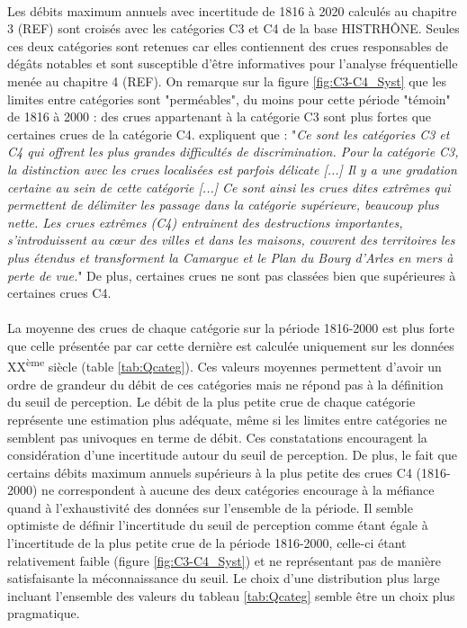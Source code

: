 \documentclass[11pt]{article}
\begin{document}
	\paragraph{} Les débits maximum annuels avec incertitude de 1816 à 2020 calculés au chapitre 3 (REF) sont croisés avec les catégories C3 et C4 de la base HISTRHÔNE. Seules ces deux catégories sont retenues car elles contiennent des crues responsables de dégâts notables et sont susceptible d'être informatives pour l'analyse fréquentielle menée au chapitre 4 (REF). On remarque sur la figure \ref{fig:C3-C4_Syst} que les limites entre catégories sont "perméables", du moins pour cette période "témoin" de 1816 à 2000 : des crues appartenant à la catégorie C3 sont plus fortes que certaines crues de la catégorie C4. \citet{pichard_sept_2014} expliquent que : "\textit{Ce sont les catégories C3 et C4 qui offrent les plus grandes difficultés de discrimination. Pour la catégorie C3, la distinction avec les crues localisées est parfois délicate [...] Il y a une gradation certaine au sein de cette catégorie [...] Ce sont ainsi les crues dites extrêmes qui permettent de délimiter les passage dans la catégorie supérieure, beaucoup plus nette. Les crues extrêmes (C4) entrainent des destructions importantes, s'introduissent au cœur des villes et dans les maisons, couvrent des territoires les plus étendus et transforment la Camargue et le Plan du Bourg d'Arles en mers à perte de vue.}" De plus, certaines crues ne sont pas classées bien que supérieures à certaines crues C4.	
	
	\paragraph{} La moyenne des crues de chaque catégorie sur la période 1816-2000 est plus forte que celle présentée par \citet{pichard_hydro-climatology_2017} car cette dernière est calculée uniquement sur les données XX\textsuperscript{ème} siècle (table \ref{tab:Qcateg}). Ces valeurs moyennes permettent d'avoir un ordre de grandeur du débit de ces catégories mais ne répond pas à la définition du seuil de perception. Le débit de la plus petite crue de chaque catégorie représente une estimation plus adéquate, même si les limites entre catégories ne semblent pas univoques en terme de débit. Ces constatations encouragent la considération d'une incertitude autour du seuil de perception. De plus, le fait que certains débits maximum annuels supérieurs à la plus petite des crues C4 (1816-2000) ne correspondent à aucune des deux catégories encourage à la méfiance quand à l'exhaustivité des données sur l'ensemble de la période. Il semble optimiste de définir l'incertitude du seuil de perception comme étant égale à l'incertitude de la plus petite crue de la période 1816-2000, celle-ci étant relativement faible (figure \ref{fig:C3-C4_Syst}) et ne représentant pas de manière satisfaisante la méconnaissance du seuil. Le choix d'une distribution plus large incluant l'ensemble des valeurs du tableau \ref{tab:Qcateg} semble être un choix plus pragmatique.	
\end{document}
